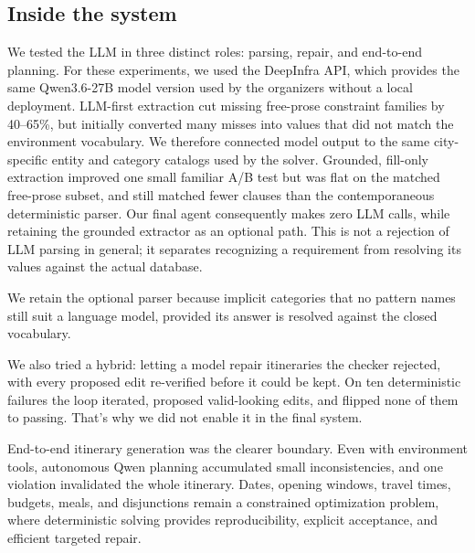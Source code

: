 \documentclass{article}
\begin{document}
\subsection{Inside the system}

We tested the LLM in three distinct roles: parsing, repair, and end-to-end
planning. For these experiments, we used the DeepInfra API, which provides the same Qwen3.6-27B
model version used by the organizers without a local deployment. LLM-first extraction cut
missing free-prose constraint families by 40--65\%, but initially converted many
misses into values that did not match the environment vocabulary.
We therefore connected model output to the same city-specific entity and category
catalogs used by the solver. Grounded, fill-only extraction improved one small
familiar A/B test but was flat on the matched free-prose subset, and still matched fewer
clauses than the contemporaneous deterministic parser.
Our final agent consequently makes zero LLM calls, while retaining the
grounded extractor as an optional path. This is not a rejection of LLM parsing in general;
it separates recognizing a requirement from resolving its values against the
actual database.

We retain the optional parser because implicit categories that no pattern names
still suit a language model, provided its answer is resolved against the closed
vocabulary.

We also tried a hybrid: letting a model repair itineraries the checker
rejected, with every proposed edit re-verified before it could be kept. On ten
deterministic failures the loop iterated, proposed valid-looking edits, and
flipped none of them to passing. That's why we did not enable it in the final system.

End-to-end itinerary generation was the clearer boundary. Even with environment
tools, autonomous Qwen planning accumulated small inconsistencies, and one
violation invalidated the whole itinerary. Dates, opening windows, travel times,
budgets, meals, and disjunctions remain a constrained optimization problem, where
deterministic solving provides reproducibility, explicit acceptance, and efficient
targeted repair.
\end{document}
